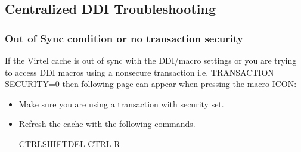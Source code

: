 \documentclass[letterpaper,10pt,english]{sphinxmanual}
\begin{document}
\begin{sphinxVerbatim}[commandchars=\\\{\}]
\PYG{p}{[}\PYG{p}{]}
\end{sphinxVerbatim}

\sphinxAtStartPar
{}

\ignorespaces 

\subsection{Centralized DDI Troubleshooting}
\label{\detokenize{Customization:centralized-ddi-troubleshooting}}\label{\detokenize{Customization:index-92}}

\subsubsection{Out of Sync condition or no transaction security}
\label{\detokenize{Customization:out-of-sync-condition-or-no-transaction-security}}
\sphinxAtStartPar
If the Virtel cache is out of sync with the DDI/macro settings or you are trying to access DDI macros using a non\sphinxhyphen{}secure transaction i.e. TRANSACTION SECURITY=0  then following page can appear when pressing the macro ICON:\sphinxhyphen{}

\sphinxAtStartPar
{}

\sphinxAtStartPar
{}

\sphinxAtStartPar
{}
\begin{itemize}
\item {} 
\sphinxAtStartPar
Make sure you are using a transaction with security set.

\item {} 
\sphinxAtStartPar
Refresh the cache with the following commands.

\sphinxAtStartPar
CTRL\sphinxhyphen{}SHIFT\sphinxhyphen{}DEL
CTRL R

\end{itemize}
\end{document}
